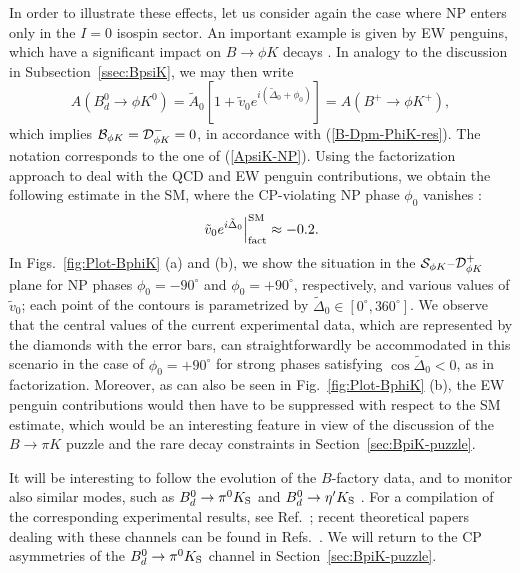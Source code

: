 \documentclass[12pt]{article}
\begin{document}
In order to illustrate these effects, let us consider again the case where NP enters 
only in the $I=0$ isospin sector. An important example is given by EW penguins, 
which have a significant impact on $B\to\phi K$ decays \cite{RF-EWP}. In analogy
to the discussion in Subsection~\ref{ssec:BpsiK}, we may then write
\begin{equation}\label{AphiK-NP}
A(B^0_d\to \phi K^0)=\tilde A_0\left[1+\tilde v_0e^{i(\tilde \Delta_0+\phi_0)}\right]=
A(B^+ \to \phi K^+),
\end{equation}
which implies ${\cal B}_{\phi K} ={\cal D}^-_{\phi K}=0$, in accordance with 
(\ref{B-Dpm-PhiK-res}). The notation corresponds to the one of (\ref{ApsiK-NP}).  
Using the factorization approach to deal with the QCD and EW penguin contributions, 
we obtain the following estimate in the SM, where the CP-violating NP phase
$\phi_0$ vanishes \cite{BFRS3}:
\begin{equation}\label{v-SM-phiK}
\left.\tilde v_0e^{i\tilde \Delta_0}\right|_{\rm fact}^{\rm SM}\approx -0.2.
\end{equation}
In Figs.~\ref{fig:Plot-BphiK} (a) and (b), we show the situation in the 
${\cal S}_{\phi K}$--${\cal D}^+_{\phi K}$ plane for NP phases $\phi_0=-90^\circ$
and $\phi_0=+90^\circ$, respectively, and various values of $\tilde v_0$; each point
of the contours is parametrized by $\tilde\Delta_0\in[0^\circ,360^\circ]$. We observe 
that the central values of the current experimental data, which are represented by the 
diamonds with the error bars, can straightforwardly be accommodated in this scenario 
in the case of $\phi_0=+90^\circ$ for strong phases satisfying $\cos\tilde\Delta_0<0$, 
as in factorization. Moreover, as can also be seen in Fig.~\ref{fig:Plot-BphiK} (b),
the EW penguin contributions would then have to be suppressed with respect
to the SM estimate, which would be an interesting feature in view of the discussion of
the $B\to \pi K$ puzzle and the rare decay constraints in Section~\ref{sec:BpiK-puzzle}.

It will be interesting to follow the evolution of the $B$-factory data,
and to monitor also similar modes, such as $B^0_d\to \pi^0 K_{\rm S}$ 
\cite{PAPIII} and  $B^0_d\to \eta'K_{\rm S}$ \cite{loso}. For a compilation of 
the corresponding experimental results, see Ref.~\cite{HFAG}; recent 
theoretical papers dealing with these channels can be found in 
Refs.~\cite{BFRS2,BFRS3,BFRS-5,GGR,beneke}. We will return to the CP 
asymmetries of the $B^0_d\to \pi^0 K_{\rm S}$ channel in 
Section~\ref{sec:BpiK-puzzle}.
\end{document}
